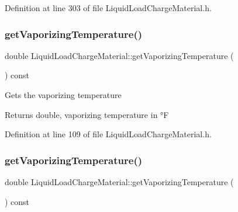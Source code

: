 Definition at line 303 of file Liquid\+Load\+Charge\+Material.\+h.

\mbox{\label{class_liquid_load_charge_material_a07004e345fb4ff287d435d0c84027973}} 
\subsubsection{\texorpdfstring{get\+Vaporizing\+Temperature()}{getVaporizingTemperature()}\hspace{0.1cm}{\footnotesize\ttfamily [1/3]}}
{\footnotesize\ttfamily double Liquid\+Load\+Charge\+Material\+::get\+Vaporizing\+Temperature (\begin{DoxyParamCaption}{ }\end{DoxyParamCaption}) const\hspace{0.3cm}{\ttfamily [inline]}}

Gets the vaporizing temperature \begin{DoxyReturn}{Returns}
double, vaporizing temperature in °F 
\end{DoxyReturn}


Definition at line 109 of file Liquid\+Load\+Charge\+Material.\+h.

\mbox{\label{class_liquid_load_charge_material_a07004e345fb4ff287d435d0c84027973}} 
\subsubsection{\texorpdfstring{get\+Vaporizing\+Temperature()}{getVaporizingTemperature()}\hspace{0.1cm}{\footnotesize\ttfamily [2/3]}}
{\footnotesize\ttfamily double Liquid\+Load\+Charge\+Material\+::get\+Vaporizing\+Temperature (\begin{DoxyParamCaption}{ }\end{DoxyParamCaption}) const\hspace{0.3cm}{\ttfamily [inline]}}


